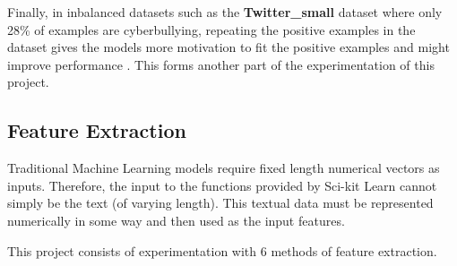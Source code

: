 \documentclass[12pt,a4paper]{article}
\begin{document}
Finally, in inbalanced datasets such as the \textbf{Twitter\_small} dataset where only 28\% of examples are cyberbullying, repeating the positive examples in the dataset gives the models more motivation to fit the positive examples and might improve performance \cite{Reynolds}. This forms another part of the experimentation of this project.


\subsection{Feature Extraction}
Traditional Machine Learning models require fixed length numerical vectors as inputs. Therefore, the input to the functions provided by Sci-kit Learn cannot simply be the text (of varying length). This textual data must be represented numerically in some way and then used as the input features.

This project consists of experimentation with 6 methods of feature extraction.
\end{document}
